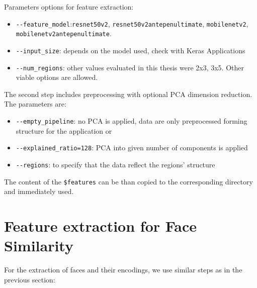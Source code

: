 \vspace{0.5cm}

Parameters options for feature extraction:
\begin{itemize}
    \item \verb+--feature_model+:\verb+resnet50v2+, \verb+resnet50v2antepenultimate+, \verb+mobilenetv2+, \verb+mobilenetv2antepenultimate+.
    \item \verb+--input_size+: depends on the model used, check with Keras Applications
    \item \verb+--num_regions+: other values evaluated in this thesis were 2x3, 3x5. Other viable options are allowed.
\end{itemize}

The second step includes preprocessing with optional PCA dimension reduction. The parameters are:
\begin{itemize}
    \item \verb+--empty_pipeline+: no PCA is applied, data are only preprocessed forming structure for the application or
    \item \verb+--explained_ratio=128+: PCA into given number of components is applied
    \item \verb+--regions+: to specify that the data reflect the regions' structure
\end{itemize}

The content of the \verb+$features+ can be than copied to the corresponding directory and immediately used.

\section{Feature extraction for Face Similarity}

For the extraction of faces and their encodings, we use similar steps as in the previous section:

\vspace{0.5cm}
\vspace{0.5cm}

